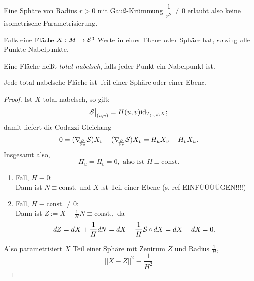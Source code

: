 \begin{example}
	
	Eine Sphäre von Radius $ r > 0 $ mit Gauß-Krümmung $ \dfrac{1}{r^2} \neq 0 $ erlaubt also keine isometrische Parametrisierung.
	
\end{example}

\begin{example}
	
	Falls eine Fläche $ X: M \rightarrow \mathcal E^3 $ Werte in einer Ebene oder Sphäre hat, so sing alle Punkte Nabelpunkte.
	
\end{example}

\begin{definition}
	
	Eine Fläche heißt \emph{total nabelsch}, falls jeder Punkt ein Nabelpunkt ist.
	
\end{definition}

\begin{theorem}
	
	Jede total nabelsche Fläche ist Teil einer Sphäre oder einer Ebene.
	
\end{theorem}

\begin{proof}
	
	Ist $ X $ total nabelsch, so gilt:
		\[ \mathcal S\big|_{(u,v)} = H(u,v) \mathrm{id}_{T_{(u,v)}X}; \]
	damit liefert die Codazzi-Gleichung
		\[ 0 = (\nabla_{\!\!{\partial\over \partial u}}\mathcal S)X_v - (\nabla_{\!\!{\partial\over \partial v}}\mathcal S)X_v = H_uX_v - H_vX_u. \]
	Insgesamt also,
		\[H_u = H_v=0, \text{ also ist } H \equiv \mathrm{const.}  \]
	
	\begin{enumerate}
		
		\item Fall, $ H \equiv 0 $:\\
		Dann ist $ N \equiv \mathrm{const.} $ und $ X $ ist Teil einer Ebene (s. ref {\color{ForestGreen} EINFÜÜÜÜGEN!!!!})
		
		\item Fall, $ H \equiv \mathrm{const.} \neq 0 $: \\
		Dann ist $ Z := X + \frac{1}{H}N \equiv \mathrm{const.}, $ da
			\[ dZ = dX + \frac{1}{H}dN = dX - \frac{1}{H}\mathcal S \circ dX = dX - dX = 0. \]
		
	\end{enumerate}

	Also parametrisiert $ X $ Teil einer Sphäre mit Zentrum $ Z $ und Radius $ \frac{1}{H} $,
		\[ ||X-Z||^2 \equiv \frac{1}{H^2} \]
	
\end{proof}

